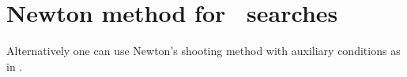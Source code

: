 

\section{Newton method  for \rpo\ searches}
\label{sec:NewtRPOs}

Alternatively one can use Newton's shooting method with auxiliary conditions 
as in .

